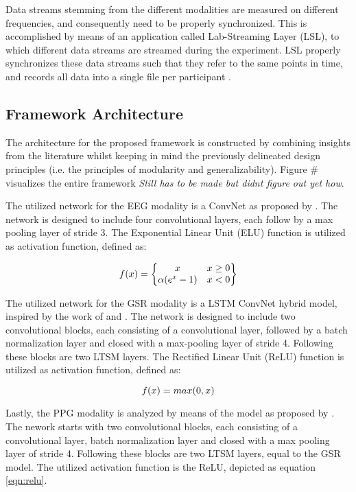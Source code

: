 \documentclass{article}
\begin{document}
Data streams stemming from the different modalities are measured on different frequencies, and consequently need to be properly synchronized. This is accomplished by means of an application called Lab-Streaming Layer (LSL), to which different data streams are streamed during the experiment. LSL properly synchronizes these data streams such that they refer to the same points in time, and records all data into a single file per participant \cite{kothe2018lab}.

\subsection{Framework Architecture}
The architecture for the proposed framework is constructed by combining insights from the literature whilst keeping in mind the previously delineated design principles (i.e. the principles of modularity and generalizability). Figure \# visualizes the entire framework \textit{Still has to be made but didnt figure out yet how}.

The utilized network for the EEG modality is a ConvNet as proposed by . The network is designed to include four convolutional layers, each follow by a max pooling layer of stride 3. The Exponential Linear Unit (ELU) function is utilized as activation function, defined as: 

\begin{equation}
f(x)= 
\begin{Bmatrix}
x & x \geq0 \\ 
\alpha (e^x -1) & x<0
\end{Bmatrix}
\bigskip
\end{equation}


The utilized network for the GSR modality is a LSTM ConvNet hybrid model, inspired by the work of  and  . The network is designed to include two convolutional blocks, each consisting of a convolutional layer, followed by a batch normalization layer and closed with a max-pooling layer of stride 4. Following these blocks are two LTSM layers. The Rectified Linear Unit (ReLU) function is utilized as activation function, defined as: 

\begin{equation} 
\label{eqn:relu}
f(x)=max(0,x)
\bigskip
\end{equation}

Lastly, the PPG modality is analyzed by means of the model as proposed by . The nework starts with two convolutional blocks, each consisting of a convolutional layer, batch normalization layer and closed with a max pooling layer of stride 4. Following these blocks are two LTSM layers, equal to the GSR model. The utilized activation function is the ReLU, depicted as equation \ref{eqn:relu}.
\end{document}
